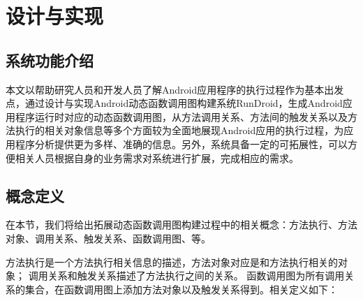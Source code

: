 \chapter{设计与实现 }
\label{ch3}

\section{系统功能介绍}
本文以帮助研究人员和开发人员了解Android应用程序的执行过程作为基本出发点，通过设计与实现Android动态函数调用图构建系统RunDroid，生成Android应用程序运行时对应的动态函数调用图，从方法调用关系、方法间的触发关系以及方法执行的相关对象信息等多个方面较为全面地展现Android应用的执行过程，为应用程序分析提供更为多样、准确的信息。另外，系统具备一定的可拓展性，可以方便相关人员根据自身的业务需求对系统进行扩展，完成相应的需求。

\section{概念定义}

在本节，我们将给出拓展动态函数调用图构建过程中的相关概念：方法执行、方法对象、调用关系、触发关系、函数调用图、\ecg 等。

方法执行是一个方法执行相关信息的描述，方法对象对应是和方法执行相关的对象；
调用关系和触发关系描述了方法执行之间的关系。
函数调用图为所有调用关系的集合，在函数调用图上添加方法对象以及触发关系得到\ecg 。相关定义如下：





